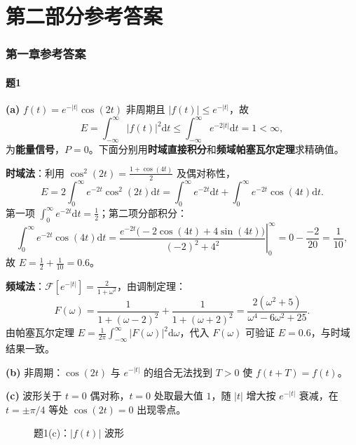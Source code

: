 \documentclass[11pt,a4paper]{ctexart}
\newcommand{\FT}{\mathcal{F}}
\newcommand{\dd}{\mathrm{d}}
\begin{document}
\part*{第二部分\quad 参考答案}

\section{第一章参考答案}

\subsection*{题1}

\textbf{(a)} $f(t)=e^{-|t|}\cos(2t)$ 非周期且 $|f(t)|\le e^{-|t|}$，故
\[
E=\int_{-\infty}^{\infty}|f(t)|^2\dd t\le\int_{-\infty}^{\infty}e^{-2|t|}\dd t=1<\infty,
\]
为\textbf{能量信号}，$P=0$。下面分别用\textbf{时域直接积分}和\textbf{频域帕塞瓦尔定理}求精确值。

\textbf{时域法}：利用 $\cos^2(2t)=\frac{1+\cos(4t)}{2}$ 及偶对称性，
\[
E=2\int_{0}^{\infty}e^{-2t}\cos^2(2t)\dd t
  =\int_{0}^{\infty}e^{-2t}\dd t+\int_{0}^{\infty}e^{-2t}\cos(4t)\dd t.
\]
第一项 $\int_{0}^{\infty}e^{-2t}\dd t=\frac{1}{2}$；第二项分部积分：
\[
\int_{0}^{\infty}e^{-2t}\cos(4t)\dd t
=\left.\frac{e^{-2t}\bigl(-2\cos(4t)+4\sin(4t)\bigr)}{(-2)^2+4^2}\right|_{0}^{\infty}
=0-\frac{-2}{20}=\frac{1}{10},
\]
故 $\displaystyle E=\frac{1}{2}+\frac{1}{10}=0.6$。

\textbf{频域法}：$\FT[e^{-|t|}]=\frac{2}{1+\omega^2}$，由调制定理：
\[
F(\omega)=\frac{1}{1+(\omega-2)^2}+\frac{1}{1+(\omega+2)^2}
        =\frac{2(\omega^2+5)}{\omega^4-6\omega^2+25}.
\]
由帕塞瓦尔定理 $E=\frac{1}{2\pi}\int_{-\infty}^{\infty}|F(\omega)|^2\dd\omega$，代入 $F(\omega)$ 可验证 $E=0.6$，与时域结果一致。

\textbf{(b)} 非周期：$\cos(2t)$ 与 $e^{-|t|}$ 的组合无法找到 $T>0$ 使 $f(t+T)=f(t)$。

\textbf{(c)} 波形关于 $t=0$ 偶对称，$t=0$ 处取最大值 $1$，随 $|t|$ 增大按 $e^{-|t|}$ 衰减，在 $t=\pm\pi/4$ 等处 $\cos(2t)=0$ 出现零点。

\begin{figure}[htbp]
\centering
{}
\caption{题1(c)：$|f(t)|$ 波形}
\end{figure}
\end{document}
